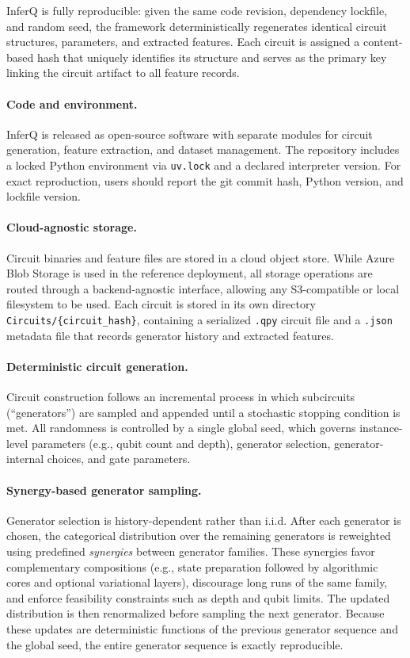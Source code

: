 \begin{appendices}
InferQ is fully reproducible: given the same code revision, dependency lockfile, and random seed, the framework deterministically regenerates identical circuit structures, parameters, and extracted features. Each circuit is assigned a content-based hash that uniquely identifies its structure and serves as the primary key linking the circuit artifact to all feature records.

\paragraph{Code and environment.}
InferQ is released as open-source software with separate modules for circuit generation, feature extraction, and dataset management. The repository includes a locked Python environment via \texttt{uv.lock} and a declared interpreter version. For exact reproduction, users should report the git commit hash, Python version, and lockfile version.

\paragraph{Cloud-agnostic storage.}
Circuit binaries and feature files are stored in a cloud object store. While Azure Blob Storage is used in the reference deployment, all storage operations are routed through a backend-agnostic interface, allowing any S3-compatible or local filesystem to be used. Each circuit is stored in its own directory
\texttt{Circuits/\{circuit\_hash\}}, containing a serialized \texttt{.qpy} circuit file and a \texttt{.json} metadata file that records generator history and extracted features.


\paragraph{Deterministic circuit generation.}
Circuit construction follows an incremental process in which subcircuits (“generators”) are sampled and appended until a stochastic stopping condition is met. All randomness is controlled by a single global seed, which governs instance-level parameters (e.g., qubit count and depth), generator selection, generator-internal choices, and gate parameters.

\paragraph{Synergy-based generator sampling.}
Generator selection is history-dependent rather than i.i.d. After each generator is chosen, the categorical distribution over the remaining generators is reweighted using predefined \emph{synergies} between generator families. These synergies favor complementary compositions (e.g., state preparation followed by algorithmic cores and optional variational layers), discourage long runs of the same family, and enforce feasibility constraints such as depth and qubit limits. The updated distribution is then renormalized before sampling the next generator. Because these updates are deterministic functions of the previous generator sequence and the global seed, the entire generator sequence is exactly reproducible.


\end{appendices}
